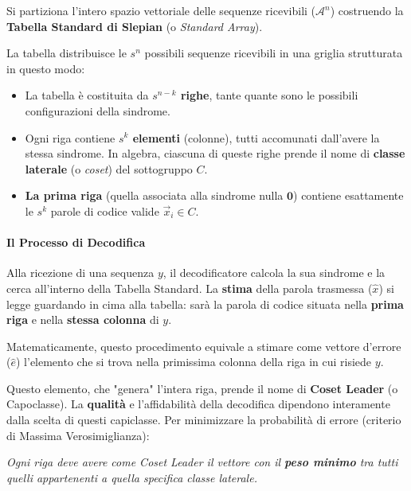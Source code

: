 Si partiziona l'intero spazio vettoriale delle sequenze ricevibili ($\mathcal{A}^n$) costruendo la \textbf{Tabella Standard di Slepian} (o \textit{Standard Array}).

La tabella distribuisce le $s^n$ possibili sequenze ricevibili in una griglia strutturata in questo modo:
\begin{itemize}
    \item La tabella è costituita da \textbf{$s^{n-k}$ righe}, tante quante sono le possibili configurazioni della sindrome.
    \item Ogni riga contiene \textbf{$s^k$ elementi} (colonne), tutti accomunati dall'avere la stessa sindrome. In algebra, ciascuna di queste righe prende il nome di \textbf{classe laterale} (o \textit{coset}) del sottogruppo $C$.
    \item \textbf{La prima riga} (quella associata alla sindrome nulla $\mathbf{0}$) contiene esattamente le $s^k$ parole di codice valide $\vec{x}_i \in C$.
\end{itemize}



\paragraph{Il Processo di Decodifica}
Alla ricezione di una sequenza $y$, il decodificatore calcola la sua sindrome e la cerca all'interno della Tabella Standard. La \textbf{stima} della parola trasmessa ($\hat{x}$) si legge guardando in cima alla tabella: sarà la parola di codice situata nella \textbf{prima riga} e nella \textbf{stessa colonna} di $y$.

Matematicamente, questo procedimento equivale a stimare come vettore d'errore ($\hat{e}$) l'elemento che si trova nella primissima colonna della riga in cui risiede $y$. 

Questo elemento, che "genera" l'intera riga, prende il nome di \textbf{Coset Leader} (o Capoclasse).
La \textbf{qualità} e l'affidabilità della decodifica dipendono interamente dalla scelta di questi capiclasse. Per minimizzare la probabilità di errore (criterio di Massima Verosimiglianza):
\begin{center}
    \textit{Ogni riga deve avere come Coset Leader il vettore con il \textbf{peso minimo} tra tutti quelli appartenenti a quella specifica classe laterale.}
\end{center}

